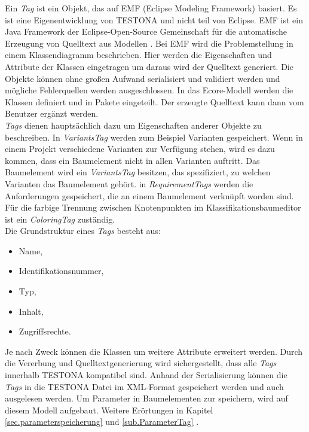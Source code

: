 Ein \textit{Tag} ist ein Objekt, das auf EMF (Eclipse Modeling Framework) basiert. Es ist eine Eigenentwicklung von TESTONA und nicht teil von Eclipse. EMF ist ein Java Framework der Eclipse-Open-Source Gemeinschaft für die automatische Erzeugung von Quelltext aus Modellen \cite{EclipseRCP}.  Bei EMF wird die Problemstellung in einem Klassendiagramm beschrieben. Hier werden die Eigenschaften und Attribute der Klassen eingetragen um daraus wird der Quelltext generiert. Die Objekte können ohne großen Aufwand serialisiert und validiert werden und mögliche Fehlerquellen werden ausgeschlossen. In das Ecore-Modell werden die Klassen definiert und in Pakete eingeteilt. Der erzeugte Quelltext kann dann vom Benutzer ergänzt werden.\\



\textit{Tags} dienen hauptsächlich dazu um Eigenschaften anderer Objekte zu beschreiben. In \textit{VariantsTag} werden zum Beispiel  Varianten gespeichert. Wenn in einem Projekt verschiedene Varianten zur Verfügung stehen, wird es dazu kommen, dass ein Baumelement nicht in allen Varianten auftritt. Das Baumelement wird ein \textit{VariantsTag} besitzen, das spezifiziert, zu welchen Varianten das Baumelement gehört. in \textit{RequirementTags} werden die Anforderungen gespeichert, die an einem Baumelement verknüpft worden sind. Für die farbige Trennung zwischen Knotenpunkten im Klassifikationsbaumeditor ist ein \textit{ColoringTag} zuständig.\\

Die Grundstruktur eines \textit{Tags} besteht aus:

\begin{itemize}
\item Name,
\item Identifikationsnummer,
\item Typ,
\item Inhalt,
\item Zugriffsrechte.
\end{itemize}


Je nach Zweck können die Klassen um weitere Attribute erweitert werden. Durch die Vererbung und Quelltextgenerierung wird sichergestellt, dass alle \textit{Tags} innerhalb TESTONA kompatibel sind. Anhand der Serialisierung können die \textit{Tags} in die TESTONA Datei im XML-Format gespeichert werden und auch ausgelesen werden. Um Parameter in Baumelementen zur speichern, wird auf diesem Modell aufgebaut. Weitere Erörtungen in Kapitel \ref{sec.parameterspeicherung} und \ref{sub.ParameterTag} .